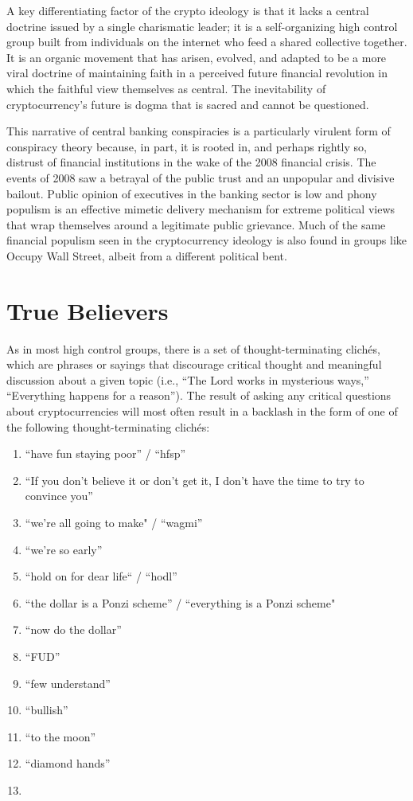 A key differentiating factor of the crypto ideology is that it lacks a central
doctrine issued by a single charismatic leader; it is a self-organizing high
control group built from individuals on the internet who feed a shared
collective together. It is an organic movement that has arisen, evolved, and
adapted to be a more viral doctrine of maintaining faith in a perceived future
financial revolution in which the faithful view themselves as central. The
inevitability of cryptocurrency's future is dogma that is sacred and cannot be
questioned.


This narrative of central banking conspiracies is a particularly virulent form
of conspiracy theory because, in part, it is rooted in, and perhaps rightly so,
distrust of financial institutions in the wake of the 2008 financial crisis. The
events of 2008 saw a betrayal of the public trust and an unpopular and divisive
bailout. Public opinion of executives in the banking sector is low and phony
populism is an effective mimetic delivery mechanism for extreme political views
that wrap themselves around a legitimate public grievance.
\cite{varoufakis_yanis_2022} Much of the same financial populism seen in the
cryptocurrency ideology is also found in groups like Occupy Wall Street, albeit
from a different political bent.

\section{True Believers}

As in most high control groups, there is a set of thought-terminating clichés,
which are phrases or sayings that discourage critical thought and meaningful
discussion about a given topic \cite{montell_cultish_2021} (i.e., ``The Lord
works in mysterious ways,'' ``Everything happens for a reason''). The result of
asking any critical questions about cryptocurrencies will most often result in a
backlash in the form of one of the following thought-terminating clichés:

\begin{enumerate}
  \item ``have fun staying poor'' / ``hfsp''
  \item ``If you don't believe it or don't get it, I don't have the time to try to convince you''
  \item ``we're all going to make" / ``wagmi''
  \item ``we're so early''
  \item ``hold on for dear life`` / ``hodl''
  \item ``the dollar is a Ponzi scheme'' / ``everything is a Ponzi scheme"
  \item ``now do the dollar''
  \item ``FUD''
  \item ``few understand''
  \item ``bullish''
  \item ``to the moon''
  \item ``diamond hands''
  \item {}
\end{enumerate}

